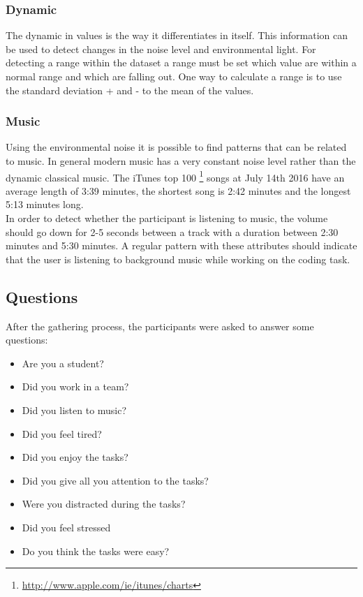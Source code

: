 {\subsubsection{Dynamic}
The dynamic in values is the way it differentiates in itself. This information can be used to detect changes in the noise level and environmental light. For detecting a range within the dataset a range must be set which value are within a normal range and which are falling out. One way to calculate a range is to use the standard deviation + and - to the mean of the values. 

\subsubsection{Music}
Using the environmental noise it is possible to find patterns that can be related to music. In general modern music has a very constant noise level rather than the dynamic classical music. The iTunes top 100 \footnote{\url{http://www.apple.com/ie/itunes/charts}} songs at July 14th 2016 have an average length of 3:39 minutes, the shortest song is 2:42 minutes and the longest 5:13 minutes long.\\
In order to detect whether the participant is listening to music, the volume should go down for 2-5 seconds between a track with a duration between 2:30 minutes and 5:30 minutes. 
A regular pattern with these attributes should indicate that the user is listening to background music while working on the coding task.

\subsection{Questions}
After the gathering process, the participants were asked to answer some questions:
\begin{itemize}
\item Are you a student?
\item Did you work in a team?
\item Did you listen to music?
\item Did you feel tired?
\item Did you enjoy the tasks?
\item Did you give all you attention to the tasks?
\item Were you distracted during the tasks?
\item Did you feel stressed
\item Do you think the tasks were easy?
\end{itemize}

}
